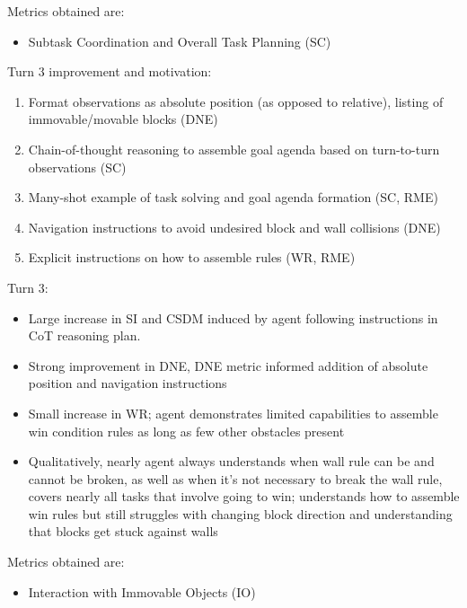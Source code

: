 Metrics obtained are:
\begin{itemize}
    \item Subtask Coordination and Overall Task Planning (SC)
\end{itemize}

Turn 3 improvement and motivation:
\begin{enumerate}
    \item Format observations as absolute position (as opposed to relative), listing of immovable/movable blocks (DNE)
    \item Chain-of-thought reasoning to assemble goal agenda based on turn-to-turn observations (SC)
    \item Many-shot example of task solving and goal agenda formation (SC, RME)
    \item Navigation instructions to avoid undesired block and wall collisions (DNE)
    \item Explicit instructions on how to assemble rules (WR, RME)
\end{enumerate}

Turn 3:

\begin{itemize}
    \item Large increase in SI and CSDM induced by agent following instructions in CoT reasoning plan.
    \item Strong improvement in DNE, DNE metric informed addition of absolute position and navigation instructions
    \item Small increase in WR; agent demonstrates limited capabilities to assemble win condition rules as long as few other obstacles present
    \item Qualitatively, nearly agent always understands when wall rule can be and cannot be broken, as well as when it's not necessary to break the wall rule, covers nearly all tasks that involve going to win; understands how to assemble win rules but still struggles with changing block direction and understanding that blocks get stuck against walls

\end{itemize}

Metrics obtained are:
\begin{itemize}
    \item Interaction with Immovable Objects (IO)
\end{itemize}

